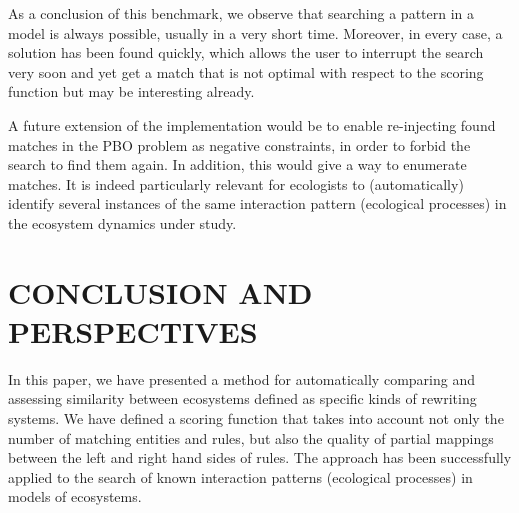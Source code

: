 \documentclass[a4paper,twoside]{article}
\begin{document}
As a conclusion of this benchmark, we observe that searching a pattern in a model is always possible, usually in a very short time.
Moreover, in every case, a solution has been found quickly, which allows the user to interrupt the search very soon and yet get a match that is not optimal with respect to the scoring function but may be interesting already.


A future extension of the implementation would be to enable re-injecting found matches in the PBO problem as negative constraints, in order to forbid the search to find them again. 
In addition, this would give a way to enumerate matches.  
It is indeed particularly relevant for ecologists to (automatically) identify several instances of the same interaction pattern (ecological processes) in the ecosystem dynamics under study. 


\section{\uppercase{Conclusion and perspectives}}
\label{sec:conclusion}

In this paper, we have presented a method for automatically comparing and assessing similarity between ecosystems defined as specific kinds of rewriting systems. 
We have defined a scoring function that takes into account not only the number of matching entities and rules, but also the quality of partial mappings between the left and right hand sides of rules. 
The approach has been successfully applied to the search of known interaction patterns (\ie ecological processes) in models of ecosystems. 
\end{document}
